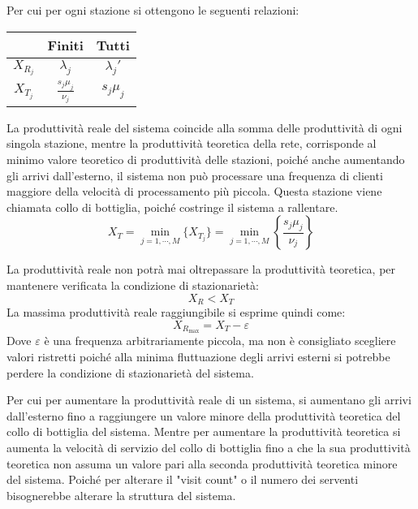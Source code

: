 \documentclass{article}
\numberwithin{equation}{subsection}
\begin{document}
Per cui per ogni stazione si ottengono le seguenti relazioni:
\begin{center}
    \begin{tabular}{c|c|c|}
        & Finiti & Tutti\\
        \hline
        $X_{R_j}$ & $\lambda_j$ & $\lambda_j'$\\
        \hline
        $X_{T_j}$ & $\frac{s_j\mu_j}{\nu_j}$ & $s_j\mu_j$\\
        \hline
    \end{tabular}
\end{center}
La produttività reale del sistema coincide alla somma delle produttività di ogni singola stazione, mentre la produttività teoretica della rete, corrisponde al minimo valore 
teoretico di produttività delle stazioni, poiché anche aumentando gli arrivi dall'esterno, il sistema non può processare una frequenza di clienti maggiore della 
velocità di processamento più piccola. Questa stazione viene chiamata collo di bottiglia, poiché costringe il sistema a rallentare. 
\begin{equation}
    X_T=\min_{j=1,\cdots,M}\{X_{T_j}\}=\min_{j=1,\cdots,M}\left\{\displaystyle\frac{s_j\mu_j}{\nu_j}\right\}
\end{equation}

La produttività reale non potrà mai oltrepassare la produttività teoretica, per mantenere verificata la condizione di stazionarietà:
\begin{equation*}
    X_R< X_T
\end{equation*}
La massima produttività reale raggiungibile si esprime quindi come:
\begin{equation}
    X_{R_{\max}}=X_T-\varepsilon
\end{equation}
Dove $\varepsilon$ è una frequenza arbitrariamente piccola, ma non è consigliato scegliere valori ristretti poiché alla minima fluttuazione degli arrivi esterni si potrebbe 
perdere la condizione di stazionarietà del sistema. 

Per cui per aumentare la produttività reale di un sistema, si aumentano gli arrivi dall'esterno fino a raggiungere un valore minore della produttività teoretica del collo di 
bottiglia del sistema. Mentre per aumentare la produttività teoretica si aumenta la velocità di servizio del collo di bottiglia fino a che la sua produttività teoretica non assuma 
un valore pari alla seconda produttività teoretica minore del sistema. Poiché per alterare il "visit count" o il numero dei serventi bisognerebbe alterare la struttura del 
sistema. 
\end{document}
